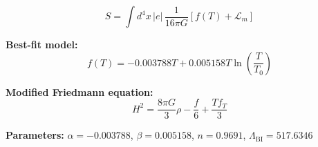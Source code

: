 
\begin{equation}
  S = \int d^4x \, |e| \, \frac{1}{16\pi G} \left[ f(T) + \mathcal{L}_m \right]
\end{equation}

\textbf{Best-fit model:}
\begin{equation}
  f(T) = -0.003788 T + 0.005158 T \ln\!\left(\frac{T}{T_0}\right)
\end{equation}

\textbf{Modified Friedmann equation:}
\begin{equation}
  H^2 = \frac{8\pi G}{3} \rho - \frac{f}{6} + \frac{T f_T}{3}
\end{equation}

\textbf{Parameters:}
$\alpha = -0.003788$, \quad
$\beta = 0.005158$, \quad
$n = 0.9691$, \quad
$\Lambda_{\text{BI}} = 517.6346$